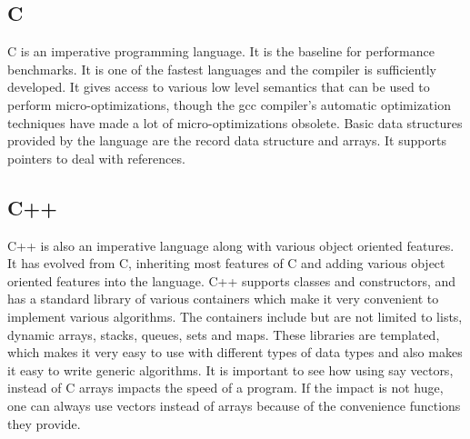 \subsection{C} 
C is an imperative programming language. It is the baseline for performance
benchmarks. It is one of the fastest languages and the compiler is sufficiently
developed. It gives access to various low level semantics that can be used to
perform micro-optimizations, though the gcc compiler's automatic optimization 
techniques have made a lot of micro-optimizations obsolete. Basic data structures
provided by the language are the record data structure and arrays. It supports 
pointers to deal with references.

\subsection{C++}
C++ is also an imperative language along with various object oriented features. 
It has evolved from C, inheriting most features of C and adding various object 
oriented features into the language. C++ supports classes and constructors, 
and has a standard library of various containers which make it very convenient
to implement various algorithms. The containers include but are not limited 
to lists, dynamic arrays, stacks, queues, sets and maps. These libraries are
templated, which makes it very easy to use with different types of data types
and also makes it easy to write generic algorithms. It is important to see 
how using say vectors, instead of C arrays impacts the speed of a program. If
the impact is not huge, one can always use vectors instead of arrays because
of the convenience functions they provide. 

